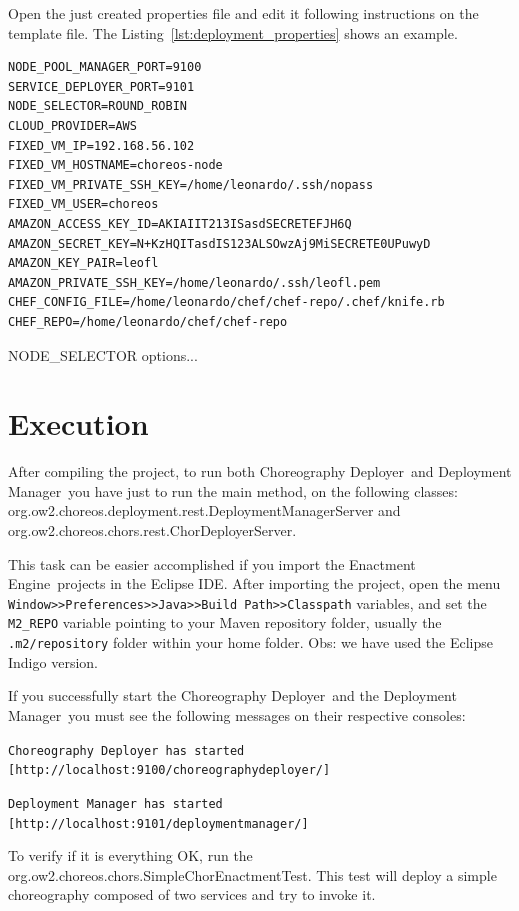 \documentclass[a4paper, 10pt]{article}
\newcommand{\ee}{Enactment Engine}
\newcommand{\cd}{Choreography Deployer}
\newcommand{\dm}{Deployment Manager}
\begin{document}
Open the just created properties file and edit it following instructions on the template file. The Listing~\ref{lst:deployment_properties} shows an example.

\lstset{
numbers=left
}

{\footnotesize
\begin{lstlisting}[caption=deployment.properties example,label=lst:deployment_properties] 
NODE_POOL_MANAGER_PORT=9100
SERVICE_DEPLOYER_PORT=9101
NODE_SELECTOR=ROUND_ROBIN
CLOUD_PROVIDER=AWS
FIXED_VM_IP=192.168.56.102
FIXED_VM_HOSTNAME=choreos-node
FIXED_VM_PRIVATE_SSH_KEY=/home/leonardo/.ssh/nopass
FIXED_VM_USER=choreos
AMAZON_ACCESS_KEY_ID=AKIAIIT213ISasdSECRETEFJH6Q
AMAZON_SECRET_KEY=N+KzHQITasdIS123ALSOwzAj9MiSECRETE0UPuwyD
AMAZON_KEY_PAIR=leofl
AMAZON_PRIVATE_SSH_KEY=/home/leonardo/.ssh/leofl.pem
CHEF_CONFIG_FILE=/home/leonardo/chef/chef-repo/.chef/knife.rb
CHEF_REPO=/home/leonardo/chef/chef-repo
\end{lstlisting}
}

NODE\_SELECTOR options...


\section{Execution}

After compiling the project, to run both \cd\ and \dm\ you have just to run the main method, on the following classes: \textsf{org.ow2.choreos.deployment.rest.DeploymentManagerServer} and \textsf{org.ow2.choreos.chors.rest.ChorDeployerServer}.

This task can be easier accomplished if you import the \ee\ projects in the Eclipse IDE. After importing the project, open the menu \texttt{Window>>Preferences>>Java>>Build Path>>Classpath} variables, and set the \texttt{M2\_REPO} variable pointing to your Maven repository folder, usually the \texttt{.m2/repository} folder within your home folder. Obs: we have used the Eclipse Indigo version.

If you successfully start the \cd\ and the \dm\, you must see the following messages on their respective consoles: 

\texttt{\cd\ has started [http://localhost:9100/choreographydeployer/]}

\texttt{\dm\ has started [http://localhost:9101/deploymentmanager/]}

To verify if it is everything OK, run the \textsf{org.ow2.choreos.chors.SimpleChorEnactmentTest}. This test will deploy a simple choreography composed of two services and try to invoke it.
\end{document}

